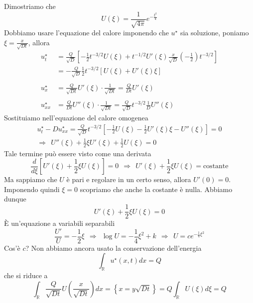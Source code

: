 \documentclass[10pt,a4paper,twoside,openright]{book}
\begin{document}
Dimostriamo che
\begin{equation*}
U(\xi) =\frac{1}{\sqrt{4\pi }} e^{-\frac{\xi ^{2}}{4}}
\end{equation*}
Dobbiamo usare l'equazione del calore imponendo che $u^{\star }$ sia soluzione, poniamo $\xi =\frac{x}{\sqrt{Dt}}$, allora
\begin{align*}
u^{\star }_{t} & =\frac{Q}{\sqrt{D}}\left[ -\frac{1}{2} t^{-3/2} U(\xi) +t^{-1/2} U'(\xi)\frac{x}{\sqrt{D}}\left( -\frac{1}{2}\right) t^{-3/2}\right]\\
 & =-\frac{Q}{\sqrt{D}}\frac{1}{2} t^{-3/2}[ U(\xi) +U'(\xi) \xi ]\\
 & \\
u^{\star }_{x} & =\frac{Q}{\sqrt{Dt}} U'(\xi) \cdotp \frac{1}{\sqrt{Dt}} =\frac{Q}{Dt} U'(\xi)\\
 & \\
u^{\star }_{xx} & =\frac{Q}{Dt} U''(\xi) \cdotp \frac{1}{\sqrt{Dt}} =\frac{Q}{\sqrt{D}} t^{-3/2}\frac{1}{D} U''(\xi)
\end{align*}
Sostituiamo nell'equazione del calore omogenea
\begin{gather*}
u^{\star }_{t} -Du^{\star }_{xx} =\frac{Q}{\sqrt{D}} t^{-3/2}\left[ -\frac{1}{2} U(\xi) -\frac{1}{2} U'(\xi) \xi -U''(\xi)\right] =0\\
\Rightarrow \ \ U''(\xi) +\frac{1}{2} \xi U'(\xi) +\frac{1}{2} U(\xi) =0
\end{gather*}
Tale termine può essere visto come una derivata
\begin{equation*}
\frac{d}{d\xi }\left[ U'(\xi) +\frac{1}{2} \xi U(\xi)\right] =0\ \ \Rightarrow \ \ U'(\xi) +\frac{1}{2} \xi U(\xi) =\text{costante}
\end{equation*}
Ma sappiamo che $U$ è pari e regolare in un certo senso, allora $U'(0) =0$. Imponendo quindi $\xi =0$ scopriamo che anche la costante è nulla. Abbiamo dunque
\begin{equation*}
U'(\xi) +\frac{1}{2} \xi U(\xi) =0
\end{equation*}
È un'equazione a variabili separabili
\begin{equation*}
\frac{U'}{U} =-\frac{1}{2} \xi \ \ \Rightarrow \ \ \log U=-\frac{1}{4} \xi ^{2} +k\ \ \Rightarrow \ \ U=ce^{-\frac{1}{4} \xi ^{2}}
\end{equation*}
Cos'è $c$? Non abbiamo ancora usato la conservazione dell'energia
\begin{equation*}
\int _{\mathbb{R}} u^{\star }(x,t) dx=Q
\end{equation*}
che si riduce a
\begin{equation*}
\int _{\mathbb{R}}\frac{Q}{\sqrt{Dt}} U\left(\frac{x}{\sqrt{Dt}}\right) dx=\left\{x=y\sqrt{Dt}\right\} =Q\int _{\mathbb{R}} U(\xi) d\xi =Q
\end{equation*}
\end{document}
